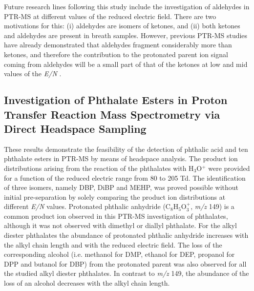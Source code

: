 Future research lines following this study include the investigation of aldehydes in PTR-MS at different values of the reduced electric field.
%
There are two motivations for this: (i) aldehydes are isomers of ketones, and (ii) both ketones and aldehydes are present in breath samples.
%
However, previous PTR-MS studies have already demonstrated that aldehydes fragment considerably more than ketones, and therefore the contribution to the protonated parent ion signal coming from aldehydes will be a small part of that of the ketones at low and mid values of the \textit{E/N} \cite{buhr2002analysis,schwarz2009determining}.



\subsection{Investigation of Phthalate Esters in Proton Transfer Reaction Mass Spectrometry
via Direct Headspace Sampling}


These results demonstrate the feasibility of the detection of phthalic acid and ten phthalate esters in PTR-MS by means of headspace analysis. 
%
The product ion distributions arising from the reaction of the phthalates with H$_3$O$^+$ were provided for a function of the reduced electric range from 80 to 205 Td.
%
The identification of three isomers, namely  DBP, DiBP and MEHP, was proved possible without initial pre-separation by solely comparing the product ion distributions at different \textit{E/N} values.
%
Protonated phthalic anhydride (C$_8$H$_5$O$_3^+$, \textit{m/z} 149) is a common product ion observed in this PTR-MS investigation of phthalates, although it was not observed with dimethyl or diallyl phthalate.
%
For the alkyl diester phthalates the abundance of protonated phthalic anhydride  increases with the alkyl chain length and with the reduced electric field.
%
The loss of the corresponding alcohol (i.e. methanol for DMP, ethanol for DEP, propanol for DPP and butanol for DBP) from the protonated parent was also observed for all the studied alkyl diester phthalates.
%
In contrast to \textit{m/z} 149, the abundance of the loss of an alcohol decreases with the alkyl chain length. 







